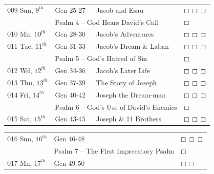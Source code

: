\documentclass[10pt,landscape,twocolumn,letterpaper]{article}
\begin{document}
\begin{tabular}{p{0.7in}p{0.7in}p{1.8in}p{0.55in}}
\tiny 009 \normalsize \textcolor[rgb]{0.00,0.00,1.00}{Sun, $9^{th}$} & \textcolor[rgb]{0.00,0.00,1.00}{Gen 25-27} & \textcolor[rgb]{0.50,0.50,0.50}{\footnotesize Jacob and Esau}  & $\boxempty$ $\boxempty$ $\boxempty$\\
     & \multicolumn{2}{l}{\textcolor[rgb]{1.00,0.00,0.00}{Psalm 4 -- God Hears David's Call}} & $\boxempty$ \\
\tiny 010 \normalsize \textcolor[rgb]{0.00,0.00,1.00}{Mn, $10^{th}$} & \textcolor[rgb]{0.00,0.00,1.00}{Gen 28-30} & \textcolor[rgb]{0.50,0.50,0.50}{\footnotesize Jacob's Adventures}  & $\boxempty$ $\boxempty$ $\boxempty$\\
\tiny 011 \normalsize \textcolor[rgb]{0.00,0.00,1.00}{Tue, $11^{th}$} & \textcolor[rgb]{0.00,0.00,1.00}{Gen 31-33} & \textcolor[rgb]{0.50,0.50,0.50}{\footnotesize Jacob's Dream \&  Laban} & $\boxempty$ $\boxempty$ $\boxempty$\\
     & \multicolumn{2}{l}{\textcolor[rgb]{1.00,0.00,0.00}{Psalm 5 -- God's Hatred of Sin}} & $\boxempty$ \\
\tiny 012 \normalsize \textcolor[rgb]{0.00,0.00,1.00}{Wd, $12^{th}$} & \textcolor[rgb]{0.00,0.00,1.00}{Gen 34-36} & \textcolor[rgb]{0.50,0.50,0.50}{\footnotesize Jacob's Later Life} & $\boxempty$ $\boxempty$ $\boxempty$\\
\tiny 013 \normalsize \textcolor[rgb]{0.00,0.00,1.00}{Thu, $13^{th}$} & \textcolor[rgb]{0.00,0.00,1.00}{Gen 37-39} & \textcolor[rgb]{0.50,0.50,0.50}{\footnotesize The Story of Joseph}  & $\boxempty$ $\boxempty$ $\boxempty$\\
\tiny 014 \normalsize \textcolor[rgb]{0.00,0.00,1.00}{Fri, $14^{th}$} & \textcolor[rgb]{0.00,0.00,1.00}{Gen 40-42} & \textcolor[rgb]{0.50,0.50,0.50}{\footnotesize Joseph the Dream-man} & $\boxempty$ $\boxempty$ $\boxempty$\\
     & \multicolumn{2}{l}{\textcolor[rgb]{1.00,0.00,0.00}{Psalm 6 -- God's Use of David's Enemies}} & $\boxempty$ \\
\tiny 015 \normalsize   \textcolor[rgb]{0.00,0.00,1.00}{Sat, $15^{th}$} & \textcolor[rgb]{0.00,0.00,1.00}{Gen 43-45} & \textcolor[rgb]{0.50,0.50,0.50}{\footnotesize Joseph \& 11 Brothers} & $\boxempty$ $\boxempty$ $\boxempty$\\
\end{tabular}

\begin{tabular}{p{0.7in}p{0.7in}p{1.8in}p{0.55in}}
\tiny 016 \normalsize \textcolor[rgb]{0.00,0.00,1.00}{Sun, $16^{th}$} & \textcolor[rgb]{0.00,0.00,1.00}{Gen 46-48} &  & $\boxempty$ $\boxempty$ $\boxempty$\\
     & \multicolumn{2}{l}{\textcolor[rgb]{1.00,0.00,0.00}{Psalm 7 -- The First Imprecatory Psalm}} & $\boxempty$ \\
\tiny 017 \normalsize \textcolor[rgb]{0.00,0.00,1.00}{Mn, $17^{th}$} & \textcolor[rgb]{0.00,0.00,1.00}{Gen 49-50} &  & $\boxempty$ $\boxempty$\\
\end{tabular}
\end{document}
